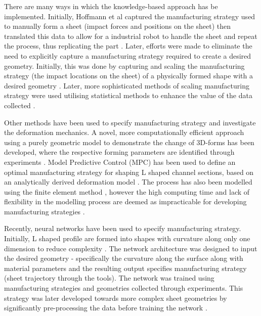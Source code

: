There are many ways in which the knowledge-based approach has be implemented. Initially, Hoffmann et al captured the manufacturing strategy used to manually form a sheet (impact forces and positions on the sheet) then translated this data to allow for a industrial robot to handle the sheet and repeat the process, thus replicating the part  \citep{Hoffman2009AnHandling}. %
Later, efforts were made to eliminate the need to explicitly capture a manufacturing strategy required to create a desired geometry. Initially, this was done by capturing and scaling the manufacturing strategy (the impact locations on the sheet) of a physically formed shape with a desired geometry \citep{Opritescu2012AutomatedStrategy}. Later, more sophisticated methods of scaling manufacturing strategy were used utilising statistical methods to enhance the value of the data collected \citep{Opritescu2016VariationVariance,Hartmann2019Knowledge-basedPartitioning}.

Other methods have been used to specify manufacturing strategy and investigate the deformation mechanics. A novel, more computationally efficient approach using a purely geometric model to demonstrate the change of 3D-forms has been developed, where the respective forming parameters are identified through experiments \citep{Yang2011GeometricalProcess}. Model Predictive Control (MPC) has been used to define an optimal manufacturing strategy for shaping L shaped channel sections, based on an analytically derived deformation model \citep{Yang2009AutomatisierungProgramming}. The process has also been modelled using the finite element method \citep{Hoffmann2005StudiesMetal}, however the high computing time and lack of flexibility in the modelling process are deemed as impracticable for developing manufacturing strategies \citep{Scherer2013MethodenBlechumformung}. 

Recently, neural networks have been used to specify manufacturing strategy. Initially,  L shaped profile are formed into shapes with curvature along only one dimension to reduce complexity \citep{Opritescu2015AutomatedApproach}. The network architecture was designed to input the desired geometry - specifically the curvature along the surface along with material parameters and the resulting output specifies manufacturing strategy (sheet trajectory through the tools). The network was trained using manufacturing strategies and geometries collected through experiments. This strategy was later developed towards more complex sheet geometries by significantly pre-processing the data before training the network \citep{Hartmann2019AnFree-forming}.

